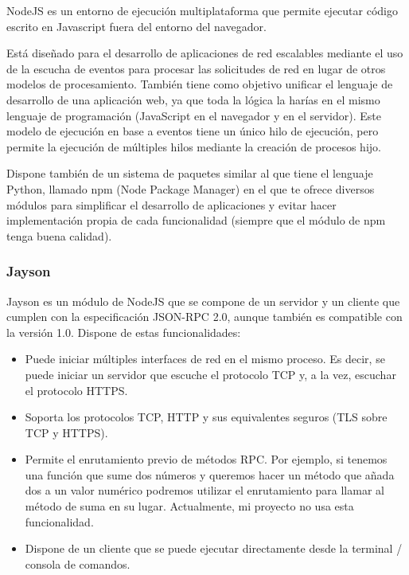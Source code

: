 \documentclass[spanish,12pt, a4paper, twoside]{paper}
\begin{document}
NodeJS es un entorno de ejecución multiplataforma que permite ejecutar código escrito en Javascript fuera del entorno del navegador.
\newline

Está diseñado para el desarrollo de aplicaciones de red escalables mediante el uso de la escucha de eventos para procesar las solicitudes de red en lugar de otros modelos de procesamiento. También tiene como objetivo unificar el lenguaje de desarrollo de una aplicación web, ya que toda la lógica la harías en el mismo lenguaje de programación (JavaScript en el navegador y en el servidor).
Este modelo de ejecución en base a eventos tiene un único hilo de ejecución, pero permite la ejecución de múltiples hilos mediante la creación de procesos hijo.
\newline

Dispone también de un sistema de paquetes similar al que tiene el lenguaje Python, llamado npm (Node Package Manager) en el que te ofrece diversos módulos para simplificar el desarrollo de aplicaciones y evitar hacer implementación propia de cada funcionalidad (siempre que el módulo de npm tenga buena calidad).

\subsubsection{Jayson}

Jayson es un módulo de NodeJS que se compone de un servidor y un cliente que cumplen con la especificación JSON-RPC 2.0, aunque también es compatible con la versión 1.0. Dispone de estas funcionalidades:

\begin{itemize}
\item Puede iniciar múltiples interfaces de red en el mismo proceso. Es decir, se puede iniciar un servidor que escuche el protocolo TCP y, a la vez, escuchar el protocolo HTTPS.
\item Soporta los protocolos TCP, HTTP y sus equivalentes seguros (TLS sobre TCP y HTTPS).
\item Permite el enrutamiento previo de métodos RPC. Por ejemplo, si tenemos una función que sume dos números y queremos hacer un método que añada dos a un valor numérico podremos utilizar el enrutamiento para llamar al método de suma en su lugar. Actualmente, mi proyecto no usa esta funcionalidad.
\item Dispone de un cliente que se puede ejecutar directamente desde la terminal / consola de comandos.
\end{itemize}
\end{document}
